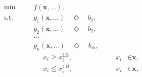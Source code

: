 \begin{subequations}
	\begin{alignat}{4}
	& \text{min} & & f \left( \textbf{x}, \dots \right)\textrm{,} &&& \\
	& \text{s.t.} & \quad & g_{1} \left( \textbf{x}, \dots \right) \quad \Diamond \quad b_{1}\textrm{,} &&&\label{eq:lp:b} \\
	& & & g_{2} \left( \textbf{x}, \dots \right) \quad \Diamond \quad b_{2}\textrm{,} &&& \\
	& & & \cdots &&& \\
	& & & g_{n} \left( \textbf{x}, \dots \right) \quad \Diamond \quad b_{m}\textrm{,} &&&\label{eq:lp:d} \\
	& & & \phantom{\sum} x_{i} \geqslant x_{i}^{\textrm{LB}}, &\quad & x_{i} &\in \textbf{x}\textrm{,} \\
	& & & \phantom{\sum} x_{i} \leqslant x_{i}^{\textrm{UB}}, &\quad & x_{i} &\in \textbf{x}\textrm{,}
	\end{alignat}
\end{subequations}\label{eq:lp}
